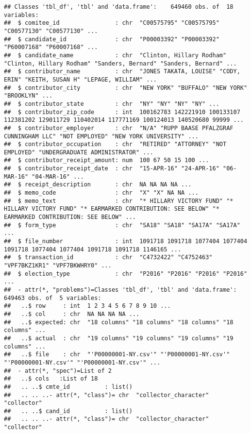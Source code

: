 \documentclass[]{article}
\begin{document}
\begin{verbatim}
## Classes 'tbl_df', 'tbl' and 'data.frame':    649460 obs. of  18 variables:
##  $ comitee_id                : chr  "C00575795" "C00575795" "C00577130" "C00577130" ...
##  $ candidate_id              : chr  "P00003392" "P00003392" "P60007168" "P60007168" ...
##  $ candidate_name            : chr  "Clinton, Hillary Rodham" "Clinton, Hillary Rodham" "Sanders, Bernard" "Sanders, Bernard" ...
##  $ contributor_name          : chr  "JONES TAKATA, LOUISE" "CODY, ERIN" "KEITH, SUSAN H" "LEPAGE, WILLIAM" ...
##  $ contributor_city          : chr  "NEW YORK" "BUFFALO" "NEW YORK" "BROOKLYN" ...
##  $ contributor_state         : chr  "NY" "NY" "NY" "NY" ...
##  $ contributor_zip_code      : int  100162783 142221910 100133107 112381202 129011729 110402014 117771169 100124013 140520680 99999 ...
##  $ contributor_employer      : chr  "N/A" "RUPP BAASE PFALZGRAF CUNNINGHAM LLC" "NOT EMPLOYED" "NEW YORK UNIVERSITY" ...
##  $ contributor_occupation    : chr  "RETIRED" "ATTORNEY" "NOT EMPLOYED" "UNDERGRADUATE ADMINISTRATOR" ...
##  $ contributor_receipt_amount: num  100 67 50 15 100 ...
##  $ contributor_receipt_date  : chr  "15-APR-16" "24-APR-16" "06-MAR-16" "04-MAR-16" ...
##  $ receipt_description       : chr  NA NA NA NA ...
##  $ memo_code                 : chr  "X" "X" NA NA ...
##  $ memo_text                 : chr  "* HILLARY VICTORY FUND" "* HILLARY VICTORY FUND" "* EARMARKED CONTRIBUTION: SEE BELOW" "* EARMARKED CONTRIBUTION: SEE BELOW" ...
##  $ form_type                 : chr  "SA18" "SA18" "SA17A" "SA17A" ...
##  $ file_number               : int  1091718 1091718 1077404 1077404 1091718 1077404 1077404 1091718 1091718 1146165 ...
##  $ transaction_id            : chr  "C4732422" "C4752463" "VPF7BKZ1KR1" "VPF7BKWHRY0" ...
##  $ election_type             : chr  "P2016" "P2016" "P2016" "P2016" ...
##  - attr(*, "problems")=Classes 'tbl_df', 'tbl' and 'data.frame': 649463 obs. of  5 variables:
##   ..$ row     : int  1 2 3 4 5 6 7 8 9 10 ...
##   ..$ col     : chr  NA NA NA NA ...
##   ..$ expected: chr  "18 columns" "18 columns" "18 columns" "18 columns" ...
##   ..$ actual  : chr  "19 columns" "19 columns" "19 columns" "19 columns" ...
##   ..$ file    : chr  "'P00000001-NY.csv'" "'P00000001-NY.csv'" "'P00000001-NY.csv'" "'P00000001-NY.csv'" ...
##  - attr(*, "spec")=List of 2
##   ..$ cols   :List of 18
##   .. ..$ cmte_id          : list()
##   .. .. ..- attr(*, "class")= chr  "collector_character" "collector"
##   .. ..$ cand_id          : list()
##   .. .. ..- attr(*, "class")= chr  "collector_character" "collector"

\end{verbatim}
\end{document}
